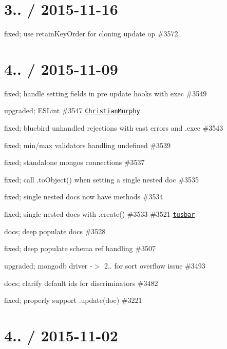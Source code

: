 \section*{3.. / 2015-\/11-\/16 }


\begin{DoxyItemize}
\item fixed; use retain\+Key\+Order for cloning update op \#3572
\end{DoxyItemize}

\section*{4.. / 2015-\/11-\/09 }


\begin{DoxyItemize}
\item fixed; handle setting fields in pre update hooks with exec \#3549
\item upgraded; E\+S\+Lint \#3547 \href{https://github.com/ChristianMurphy}{\tt Christian\+Murphy}
\item fixed; bluebird unhandled rejections with cast errors and .exec \#3543
\item fixed; min/max validators handling undefined \#3539
\item fixed; standalone mongos connections \#3537
\item fixed; call {\ttfamily .to\+Object()} when setting a single nested doc \#3535
\item fixed; single nested docs now have methods \#3534
\item fixed; single nested docs with .create() \#3533 \#3521 \href{https://github.com/tusbar}{\tt tusbar}
\item docs; deep populate docs \#3528
\item fixed; deep populate schema ref handling \#3507
\item upgraded; mongodb driver -\/$>$ 2.. for sort overflow issue \#3493
\item docs; clarify default ids for discriminators \#3482
\item fixed; properly support .update(doc) \#3221
\end{DoxyItemize}

\section*{4.. / 2015-\/11-\/02 }


